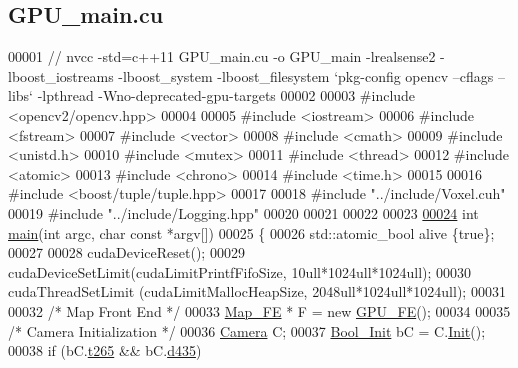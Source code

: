 \hypertarget{GPU__main_8cu_source}{}\subsection{G\+P\+U\+\_\+main.\+cu}
\label{GPU__main_8cu_source}

\begin{DoxyCode}
00001 \textcolor{comment}{// nvcc -std=c++11 GPU\_main.cu -o GPU\_main -lrealsense2 -lboost\_iostreams -lboost\_system -lboost\_filesystem
       `pkg-config opencv --cflags --libs` -lpthread -Wno-deprecated-gpu-targets}
00002 
00003 \textcolor{preprocessor}{#include <opencv2/opencv.hpp>}
00004 
00005 \textcolor{preprocessor}{#include <iostream>}
00006 \textcolor{preprocessor}{#include <fstream>}
00007 \textcolor{preprocessor}{#include <vector>}
00008 \textcolor{preprocessor}{#include <cmath>}
00009 \textcolor{preprocessor}{#include <unistd.h>}
00010 \textcolor{preprocessor}{#include <mutex>}
00011 \textcolor{preprocessor}{#include <thread>}
00012 \textcolor{preprocessor}{#include <atomic>}
00013 \textcolor{preprocessor}{#include <chrono>}
00014 \textcolor{preprocessor}{#include <time.h>}
00015 
00016 \textcolor{preprocessor}{#include <boost/tuple/tuple.hpp>}
00017 
00018 \textcolor{preprocessor}{#include "../include/Voxel.cuh"}
00019 \textcolor{preprocessor}{#include "../include/Logging.hpp"}
00020 
00021 
00022 
00023 
\hypertarget{GPU__main_8cu_source.tex_l00024}{}\hyperlink{GPU__main_8cu_abf9e6b7e6f15df4b525a2e7705ba3089}{00024} \textcolor{keywordtype}{int} \hyperlink{GPU__main_8cu_abf9e6b7e6f15df4b525a2e7705ba3089}{main}(\textcolor{keywordtype}{int} argc, \textcolor{keywordtype}{char} \textcolor{keyword}{const} *argv[])
00025 \{
00026     std::atomic\_bool alive \{\textcolor{keyword}{true}\};
00027 
00028     cudaDeviceReset();
00029     cudaDeviceSetLimit(cudaLimitPrintfFifoSize, 10ull*1024ull*1024ull);
00030     cudaThreadSetLimit (cudaLimitMallocHeapSize, 2048ull*1024ull*1024ull);
00031 
00032     \textcolor{comment}{/* Map Front End */}
00033     \hyperlink{classMap__FE}{Map\_FE} * F = \textcolor{keyword}{new} \hyperlink{classGPU__FE}{GPU\_FE}();
00034 
00035     \textcolor{comment}{/* Camera Initialization */}
00036     \hyperlink{classCamera}{Camera} C;
00037     \hyperlink{structBool__Init}{Bool\_Init} bC = C.\hyperlink{classCamera_a7f09b843d9b3a97e78eefcebbc53e054}{Init}();
00038     \textcolor{keywordflow}{if} (bC.\hyperlink{structBool__Init_a28c7d578113b5a52c1706c10be8fe6c6}{t265} && bC.\hyperlink{structBool__Init_a9b59846a335953ae88cad02cd9cf9b34}{d435})

\end{DoxyCode}
